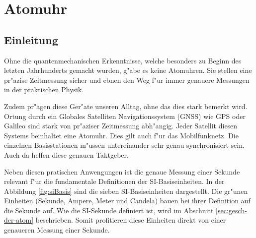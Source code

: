 \chapter{Atomuhr\label{chapter:atomuhr}}
\begin{refsection}

\section{Einleitung}
%

Ohne die quantenmechanischen Erkenntnisse, welche besonders zu Beginn des letzten Jahrhunderts gemacht wurden, g"abe es keine Atomuhren. 
Sie stellen eine pr"azise Zeitmessung sicher und ebnen den Weg f"ur immer genauere Messungen in der praktischen Physik. 

Zudem pr"agen diese Ger"ate unseren Alltag, ohne das dies stark bemerkt wird. 
Ortung durch ein Globales Satelliten Navigationssystem (GNSS) wie GPS oder Galileo sind stark von pr"aziser Zeitmessung abh"angig. 
Jeder Satellit diesen Systems beinhaltet eine Atomuhr.
Dies gilt auch f"ur das Mobilfunknetz. Die einzelnen Basisstationen m"ussen untereinander sehr genau synchronisiert sein. Auch da helfen diese genauen Taktgeber.

Neben diesen pratischen Anwengungen ist die genaue Messung einer
Sekunde relevant f"ur die fundamentale Definitionen der
SI-Basiseinheiten. In der Abbildung \ref{fig:siBasis} sind die sieben
SI-Basis\-ein\-hei\-ten dargestellt.  Die gr"unen Einheiten (Sekunde,
Ampere, Meter und Candela) bauen bei ihrer Definition auf die Sekunde
auf.  Wie die SI-Sekunde definiert ist, wird im Abschnitt
\ref{sec:gesch-der-atom} beschrieben.  Somit profitieren diese
Einheiten direkt von einer genaueren Messung einer Sekunde.

\begin{figure}
  \centering
\end{figure}
\end{refsection}
